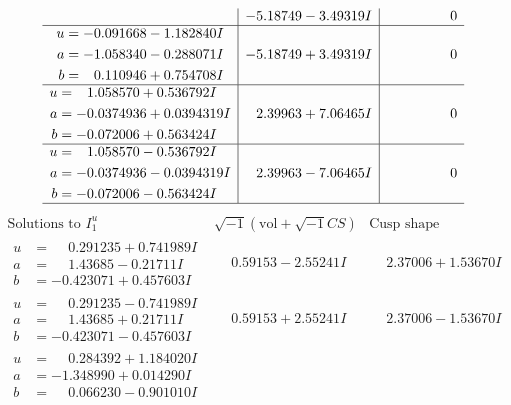 \documentclass[1p]{elsarticle_modified}
\theoremstyle{definition}
\newcommand{\I}{\sqrt{-1}}
\begin{document}
$$\begin{array}{c|c|c}
 & -5.18749 - 3.49319 I & \phantom{-0.000000 } 0 \\ \hline\begin{aligned}
u &= -0.091668 - 1.182840 I \\
a &= -1.058340 - 0.288071 I \\
b &= \phantom{-}0.110946 + 0.754708 I\end{aligned}
 & -5.18749 + 3.49319 I & \phantom{-0.000000 } 0 \\ \hline\begin{aligned}
u &= \phantom{-}1.058570 + 0.536792 I \\
a &= -0.0374936 + 0.0394319 I \\
b &= -0.072006 + 0.563424 I\end{aligned}
 & \phantom{-}2.39963 + 7.06465 I & \phantom{-0.000000 } 0 \\ \hline\begin{aligned}
u &= \phantom{-}1.058570 - 0.536792 I \\
a &= -0.0374936 - 0.0394319 I \\
b &= -0.072006 - 0.563424 I\end{aligned}
 & \phantom{-}2.39963 - 7.06465 I & \phantom{-0.000000 } 0\\
 \hline 
 \end{array}$$\newpage$$\begin{array}{c|c|c}  
\text{Solutions to }I^u_{1}& \I (\text{vol} + \sqrt{-1}CS) & \text{Cusp shape}\\
 \hline 
\begin{aligned}
u &= \phantom{-}0.291235 + 0.741989 I \\
a &= \phantom{-}1.43685 - 0.21711 I \\
b &= -0.423071 + 0.457603 I\end{aligned}
 & \phantom{-}0.59153 - 2.55241 I & \phantom{-}2.37006 + 1.53670 I \\ \hline\begin{aligned}
u &= \phantom{-}0.291235 - 0.741989 I \\
a &= \phantom{-}1.43685 + 0.21711 I \\
b &= -0.423071 - 0.457603 I\end{aligned}
 & \phantom{-}0.59153 + 2.55241 I & \phantom{-}2.37006 - 1.53670 I \\ \hline\begin{aligned}
u &= \phantom{-}0.284392 + 1.184020 I \\
a &= -1.348990 + 0.014290 I \\
b &= \phantom{-}0.066230 - 0.901010 I\end{aligned}

\end{array}$$
\end{document}
